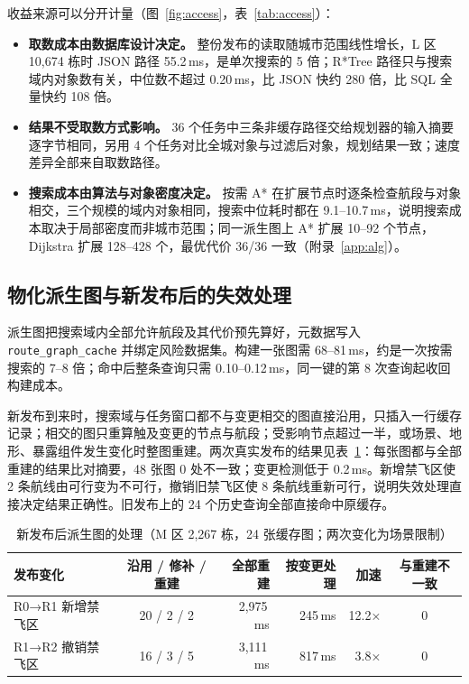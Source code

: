 \documentclass[a4paper,11pt,UTF8]{ctexart}
\begin{document}
收益来源可以分开计量（图~\ref{fig:access}，表~\ref{tab:access}）：
\begin{itemize}
\item \textbf{取数成本由数据库设计决定。} 整份发布的读取随城市范围线性增长，L 区 10,674 栋时 JSON 路径 55.2\,ms，是单次搜索的 5 倍；R*Tree 路径只与搜索域内对象数有关，中位数不超过 0.20\,ms，比 JSON 快约 280 倍，比 SQL 全量快约 108 倍。
\item \textbf{结果不受取数方式影响。} 36 个任务中三条非缓存路径交给规划器的输入摘要逐字节相同，另用 4 个任务对比全城对象与过滤后对象，规划结果一致；速度差异全部来自取数路径。
\item \textbf{搜索成本由算法与对象密度决定。} 按需 A* 在扩展节点时逐条检查航段与对象相交，三个规模的域内对象相同，搜索中位耗时都在 9.1–10.7\,ms，说明搜索成本取决于局部密度而非城市范围；同一派生图上 A* 扩展 10–92 个节点，Dijkstra 扩展 128–428 个，最优代价 36/36 一致（附录~\ref{app:alg}）。
\end{itemize}

\subsection{物化派生图与新发布后的失效处理}

派生图把搜索域内全部允许航段及其代价预先算好，元数据写入 \texttt{route\_graph\_cache} 并绑定风险数据集。构建一张图需 68–81\,ms，约是一次按需搜索的 7–8 倍；命中后整条查询只需 0.10–0.12\,ms，同一键的第 8 次查询起收回构建成本。

新发布到来时，搜索域与任务窗口都不与变更相交的图直接沿用，只插入一行缓存记录；相交的图只重算触及变更的节点与航段；受影响节点超过一半，或场景、地形、暴露组件发生变化时整图重建。两次真实发布的结果见表~\ref{tab:inval}：每张图都与全部重建的结果比对摘要，48 张图 0 处不一致；变更检测低于 0.2\,ms。新增禁飞区使 2 条航线由可行变为不可行，撤销旧禁飞区使 8 条航线重新可行，说明失效处理直接决定结果正确性。旧发布上的 24 个历史查询全部直接命中原缓存。

\begin{table}[!htbp]\centering\small
\caption{新发布后派生图的处理（M 区 2,267 栋，24 张缓存图；两次变化为场景限制）}\label{tab:inval}
\begin{tabular}{lcrrrc}
\toprule
发布变化 & 沿用 / 修补 / 重建 & 全部重建 & 按变更处理 & 加速 & 与重建不一致 \\
\midrule
R0→R1 新增禁飞区 & 20 / 2 / 2 & 2,975\,ms & 245\,ms & 12.2× & 0 \\
R1→R2 撤销禁飞区 & 16 / 3 / 5 & 3,111\,ms & 817\,ms & 3.8× & 0 \\
\bottomrule
\end{tabular}
\end{table}
\end{document}
